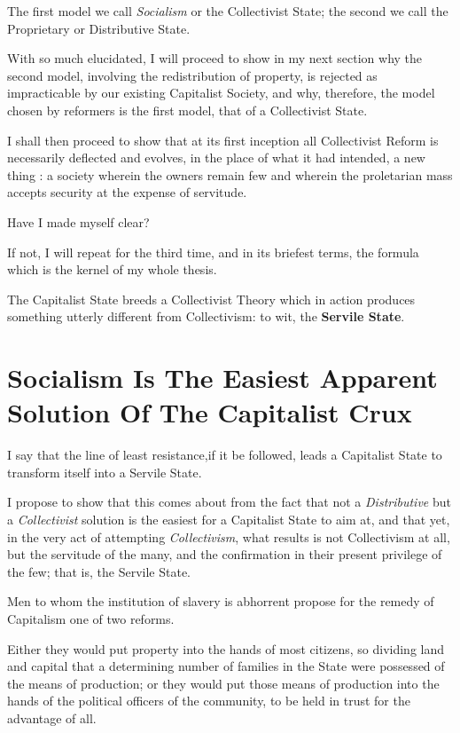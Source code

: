 \documentclass{book}
\newcommand\mdstrong[1]{\textbf{#1}}
\begin{document}
The first model we call \emph{Socialism} or the Collectivist State; the second we call the Proprietary or Distributive State.

With so much elucidated, I will proceed to show in my next section why the second model, involving the redistribution of property, is rejected as impracticable by our existing Capitalist Society, and why, therefore, the model chosen by reformers is the first model, that of a Collectivist State.

I shall then proceed to show that at its first inception all Collectivist Reform is necessarily deflected and evolves, in the place of what it had intended, a new thing : a society wherein the owners remain few and wherein the proletarian mass accepts security at the expense of servitude.

Have I made myself clear?

If not, I will repeat for the third time, and in its briefest terms, the formula which is the kernel of my whole thesis.

The Capitalist State breeds a Collectivist Theory which in action produces something utterly different from Collectivism: to wit, the \mdstrong{Servile State}.

\chapter{Socialism Is The Easiest Apparent Solution Of The Capitalist Crux}
\label{chapter-7}
I say that the line of least resistance,if it be followed, leads a Capitalist State to transform itself into a Servile State.

I propose to show that this comes about from the fact that not a \emph{Distributive} but a \emph{Collectivist} solution is the easiest for a Capitalist State to aim at, and that yet, in the very act of attempting \emph{Collectivism}, what results is not Collectivism at all, but the servitude of the many, and the confirmation in their present privilege of the few; that is, the Servile State.

Men to whom the institution of slavery is abhorrent propose for the remedy of Capitalism one of two reforms.

Either they would put property into the hands of most citizens, so dividing land and capital that a determining number of families in the State were possessed of the means of production; or they would put those means of production into the hands of the political officers of the community, to be held in trust for the advantage of all.
\end{document}
